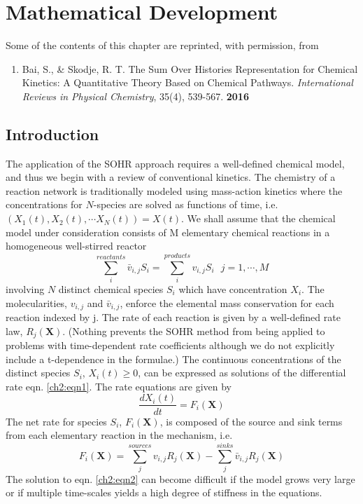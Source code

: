 \chapter{Mathematical Development}
\label{mathchapter}
Some of the contents of this chapter are reprinted, with permission, from \
\begin{enumerate}
\item[\cite{ch4_10_bai2016sum}] Bai, S., \& Skodje, R. T. The Sum Over Histories Representation for Chemical Kinetics: A Quantitative Theory Based on Chemical Pathways. \textit{International Reviews in Physical Chemistry}, 35(4), 539-567. \textbf{2016}
\end{enumerate}
\section{Introduction}
\label{ch2:sec:intro}
The application of the SOHR approach requires a well-defined chemical model, and
thus we begin with a review of conventional kinetics. The chemistry of a reaction network
is traditionally modeled using mass-action kinetics where the concentrations for
$N$-species are solved as functions of time, i.e. $\left(X_1(t), X_2(t), \cdots X_N(t)\right) = X(t)$. We shall
assume that the chemical model under consideration consists of M elementary chemical
reactions in a homogeneous well-stirred reactor
\begin{equation}
\label{ch2:eqn1}
\sum_{i}^{reactants}{{\bar{v}}_{i,j}S_i} = \sum_{i}^{products}{v_{i,j}S_i} ~~~j=1,\cdots,M 
\end{equation}
involving $N$ distinct chemical species $S_i$ which have concentration $X_i$. The molecularities,
$v_{i,j}$ and ${\bar{v}}_{i,j}$, enforce the elemental mass conservation for each reaction indexed by
j. The rate of each reaction is given by a well-defined rate law, $R_j(\mathbf{X})$. (Nothing
prevents the SOHR method from being applied to problems with time-dependent rate
coefficients although we do not explicitly include a t-dependence in the formulae.) The
continuous concentrations of the distinct species $S_i$, $X_i(t) \geq 0$, can be expressed as solutions
of the differential rate eqn. \ref{ch2:eqn1}. The rate equations are given by
\begin{equation}
\label{ch2:eqn2}
\frac{dX_i(t)}{dt} = F_i(\mathbf{X})
\end{equation}
The net rate for species $S_i$, $F_i(\mathbf{X})$, is composed of the source and sink terms from each
elementary reaction in the mechanism, i.e.
\begin{equation}
\label{ch2:eqn3}
F_i(\mathbf{X}) = \sum_{j}^{sources}{v_{i,j}R_j(\mathbf{X})} - \sum_{j}^{sinks}{{\bar{v}}_{i,j}R_j(\mathbf{X})}
\end{equation}
The solution to eqn. \ref{ch2:eqn2} can become difficult if the model grows very large or if
multiple time-scales yields a high degree of stiffness in the equations.
\newline
